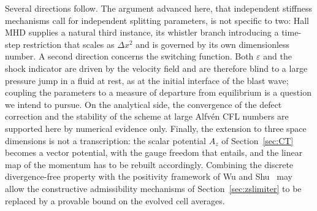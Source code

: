 \documentclass[a4paper,fleqn]{cas-sc}
\newtheorem{theorem}{Theorem}[section]
\theoremstyle{remark}
\newcommand{\eps}{\varepsilon}
\begin{document}
Several directions follow. The argument advanced here, that independent
stiffness mechanisms call for independent splitting parameters, is not specific
to two: Hall MHD supplies a natural third instance, its whistler branch
introducing a time-step restriction that scales as $\Delta x^{2}$ and is governed
by its own dimensionless number. A second direction concerns the switching
function. Both $\eps$ and the shock indicator are driven by the velocity field
and are therefore blind to a large pressure jump in a fluid at rest, as at the
initial interface of the blast wave; coupling the parameters to a measure of
departure from equilibrium is a question we intend to pursue. On the analytical
side, the convergence of the defect correction and the stability of the scheme
at large Alfv\'en CFL numbers are supported here by numerical evidence only.
Finally, the extension to three space dimensions is not a transcription: the
scalar potential $A_z$ of Section~\ref{sec:CT} becomes a vector potential, with
the gauge freedom that entails, and the linear map of the momentum has to be
rebuilt accordingly. Combining the discrete divergence-free property with the
positivity framework of Wu and Shu~\cite{WuShu2018,WuShu2019} may allow the constructive
admissibility mechanisms of Section~\ref{sec:zslimiter} to be replaced by a
provable bound on the evolved cell averages.





\end{document}
